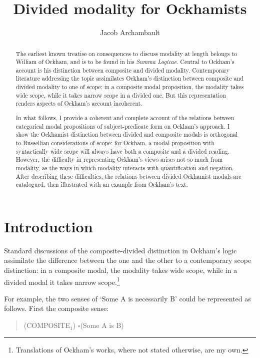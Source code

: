 \documentclass[a4paper]{article}
\title{Divided modality for Ockhamists}
\author{Jacob Archambault}
\begin{document}
\maketitle

\begin{abstract}
	The earliest known treatise on consequences to discuss modality at length belongs to William of Ockham, and is to be found in his \textit{Summa Logicae}. Central to Ockham's account is his distinction between composite and divided modality. Contemporary literature addressing the topic assimilates Ockham's distinction between composite and divided modality to one of scope: in a composite modal proposition, the modality takes wide scope, while it takes narrow scope in a divided one. But this representation renders aspects of Ockham's account incoherent. 
	
	In what follows, I provide a coherent and complete account of the relations between categorical modal propositions of subject-predicate form on Ockham's approach. I show the Ockhamist distinction between divided and composite modals is orthogonal to Russellian considerations of scope: for Ockham, a modal proposition with syntactically wide scope will always have both a composite and a divided reading. However, the difficulty in representing Ockham's views arises not so much from modality, as the ways in which modality interacts with quantification and negation. After describing these difficulties, the relations between divided Ockhamist modals are catalogued, then illustrated with an example from Ockham's text. 
\end{abstract}

\section{Introduction}
Standard discussions of the composite-divided distinction in Ockham's logic assimilate the difference between the one and the other to a contemporary scope distinction: in a composite modal, the modality takes wide scope, while in a divided modal it takes narrow scope.\footnote{Translations of Ockham's works, where not stated otherwise, are my own.}

For example, the two senses of `Some A is necessarily B' could be represented as follows. First the composite sense: 

\begin{quote}
(COMPOSITE$_{1}$) $\square$(Some A is B)
\end{quote}
\end{document}
